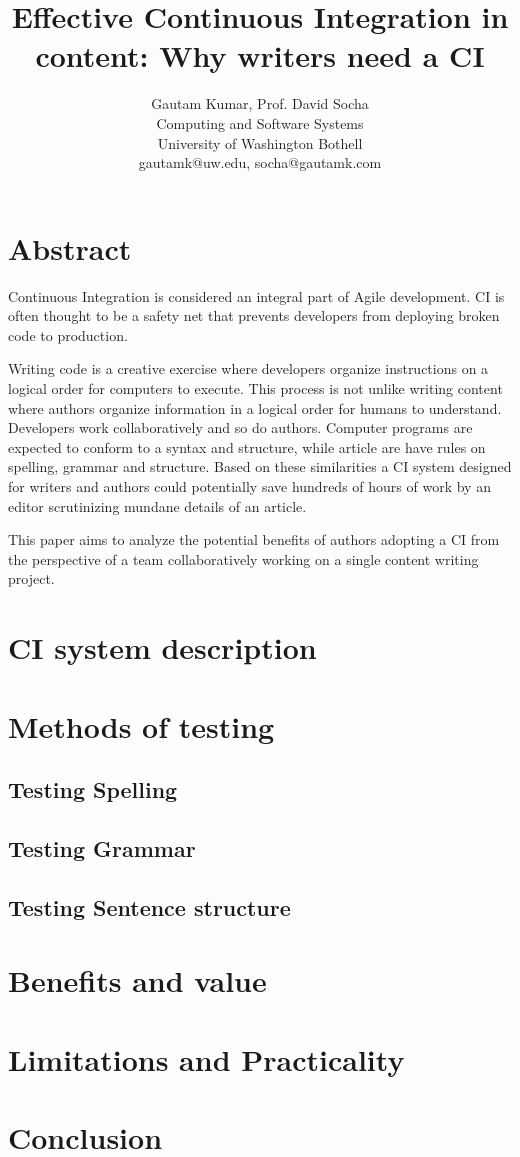 \documentclass[10pt,conference]{IEEEtran}
\begin{document}
\title{Effective Continuous Integration in content: \newline Why writers need 
a CI}


\author{
{\rm Gautam Kumar, Prof. David Socha}\\
Computing and Software Systems\\
University of Washington Bothell\\
gautamk@uw.edu, socha@gautamk.com
} %

\maketitle
\thispagestyle{empty}


\section*{Abstract}
Continuous Integration is considered an integral part of Agile development. 
CI is often thought to be a safety net that prevents developers from deploying 
broken code to production. 

Writing code is a creative exercise where developers organize instructions on 
a logical order for computers to execute. This process is not unlike writing 
content where authors organize information in a logical order for humans to 
understand. Developers work collaboratively and so do authors. Computer 
programs are expected to conform to a syntax and structure, while article are 
have rules on spelling, grammar and structure. Based on these similarities a 
CI system designed for writers and authors could potentially save hundreds of 
hours of work by an editor scrutinizing mundane details of an article.

This paper aims to analyze the potential benefits of authors adopting a CI 
from the perspective of a team collaboratively working on a single content 
writing project.

\section*{CI system description}
\section*{Methods of testing}
\subsection*{Testing Spelling}
\subsection*{Testing Grammar}
\subsection*{Testing Sentence structure}
\section*{Benefits and value}
\section*{Limitations and Practicality}
\section*{Conclusion}



\end{document}
